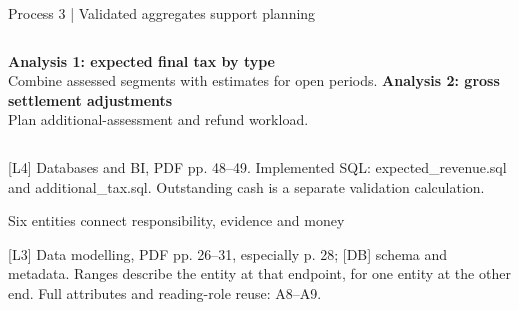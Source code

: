 \documentclass[10pt,aspectratio=169]{beamer}
\newcommand{\sources}[1]{\par\vfill{\fontsize{6.5}{7.8}\selectfont\color{muted}#1\par}}
\begin{document}
\begin{frame}{Process 3 | Validated aggregates support planning}
\begin{center}\end{center}
\begin{columns}[T,onlytextwidth]
\textbf{Analysis 1: expected final tax by type}\\Combine assessed segments with estimates for open periods.
\textbf{Analysis 2: gross settlement adjustments}\\Plan additional-assessment and refund workload.
\end{columns}
\epclegend
\sources{[L4] Databases and BI, PDF pp. 48–49. Implemented SQL: expected\_revenue.sql and additional\_tax.sql. Outstanding cash is a separate validation calculation.}
\end{frame}

\begin{frame}{Six entities connect responsibility, evidence and money}
\begin{center}\end{center}
\erlegend
\sources{[L3] Data modelling, PDF pp. 26–31, especially p. 28; [DB] schema and metadata. Ranges describe the entity at that endpoint, for one entity at the other end. Full attributes and reading-role reuse: A8–A9.}
\end{frame}
\end{document}
